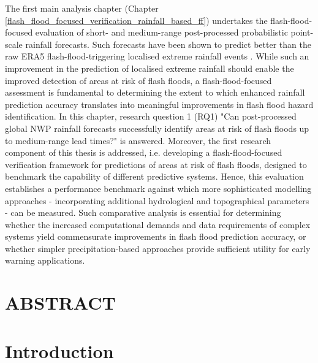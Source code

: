 The first main analysis chapter (Chapter \ref{flash_flood_focused_verification_rainfall_based_ff}) undertakes the flash-flood-focused evaluation of short- and medium-range post-processed probabilistic point-scale rainfall forecasts. Such forecasts have been shown to predict better than the raw ERA5 flash-flood-triggering localised extreme rainfall events \citep{Pillosu_2025a}. While such an improvement in the prediction of localised extreme rainfall should enable the improved detection of areas at risk of flash floods, a flash-flood-focused assessment is fundamental to determining the extent to which enhanced rainfall prediction accuracy translates into meaningful improvements in flash flood hazard identification. In this chapter, \textcolor{colour_chapter5}{research question 1 (RQ1) "Can post-processed global NWP rainfall forecasts successfully identify areas at risk of flash floods up to medium-range lead times?"} is answered. Moreover, the first research component of this thesis is addressed, i.e. \textcolor{colour_chapter5}{developing a flash-flood-focused verification framework for predictions of areas at risk of flash floods, designed to benchmark the capability of different predictive systems}. Hence, this evaluation establishes a performance benchmark against which more sophisticated modelling approaches - incorporating additional hydrological and topographical parameters - can be measured. Such comparative analysis is essential for determining whether the increased computational demands and data requirements of complex systems yield commensurate improvements in flash flood prediction accuracy, or whether simpler precipitation-based approaches provide sufficient utility for early warning applications.

\clearpage

\section*{ABSTRACT}

\clearpage



\section{Introduction}

